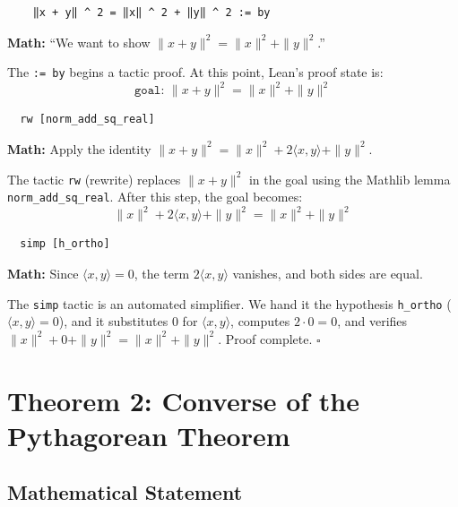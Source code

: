 \documentclass[11pt]{article}
\theoremstyle{plain}
\theoremstyle{definition}
\begin{document}
\begin{tcolorbox}[title=Line 4: The goal]
\begin{lstlisting}
    ‖x + y‖ ^ 2 = ‖x‖ ^ 2 + ‖y‖ ^ 2 := by
\end{lstlisting}
\textbf{Math:} ``We want to show $\|x+y\|^2 = \|x\|^2 + \|y\|^2$.''

The \texttt{:= by} begins a tactic proof. At this point, Lean's proof state is:
\[
  \texttt{goal: } \|x+y\|^2 = \|x\|^2 + \|y\|^2
\]
\end{tcolorbox}

\begin{tcolorbox}[title=Line 5: Rewrite using the polarization identity]
\begin{lstlisting}
  rw [norm_add_sq_real]
\end{lstlisting}
\textbf{Math:} Apply the identity
$\|x+y\|^2 = \|x\|^2 + 2\langle x,y\rangle + \|y\|^2$.

The tactic \texttt{rw} (rewrite) replaces $\|x+y\|^2$ in the goal using the
Mathlib lemma \texttt{norm\_add\_sq\_real}. After this step, the goal becomes:
\[
  \|x\|^2 + 2\langle x,y\rangle + \|y\|^2 = \|x\|^2 + \|y\|^2
\]
\end{tcolorbox}

\begin{tcolorbox}[title=Line 6: Simplify using orthogonality]
\begin{lstlisting}
  simp [h_ortho]
\end{lstlisting}
\textbf{Math:} Since $\langle x,y\rangle = 0$, the term $2\langle x,y\rangle$
vanishes, and both sides are equal.

The \texttt{simp} tactic is an automated simplifier. We hand it the hypothesis
\texttt{h\_ortho} ($\langle x,y\rangle = 0$), and it substitutes $0$ for
$\langle x,y\rangle$, computes $2 \cdot 0 = 0$, and verifies
$\|x\|^2 + 0 + \|y\|^2 = \|x\|^2 + \|y\|^2$. Proof complete. $\square$
\end{tcolorbox}

\section{Theorem 2: Converse of the Pythagorean Theorem}

\subsection{Mathematical Statement}
\end{document}
